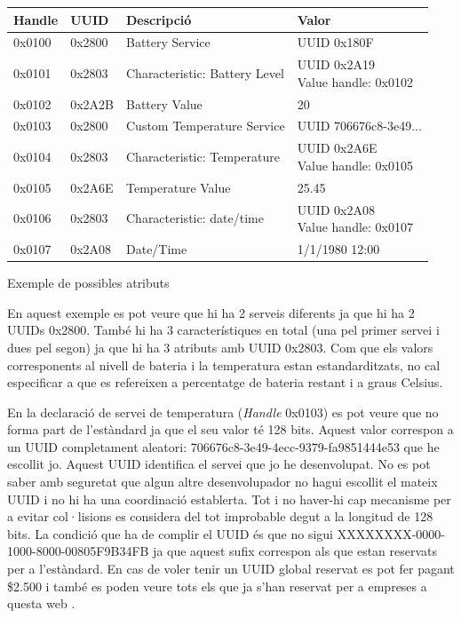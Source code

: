 \begin{center}
	\begin{tabular}{|l|l|l|l|}
		\hline
		Handle	&	UUID	&	Descripció						&	Valor		\\ 	\hline
		0x0100	&	0x2800	&	Battery Service					&	UUID 0x180F	\\		\hline
		0x0101	&	0x2803	&	Characteristic: Battery Level	&	\parbox[t]{4cm}{UUID 0x2A19	\\ Value handle: 0x0102}	\\	\hline
		0x0102	&	0x2A2B	&	Battery Value					&	20	\\	\hline
		0x0103	&	0x2800	&	Custom Temperature Service		&	UUID 	706676c8-3e49...	\\	\hline
		0x0104	&	0x2803	&	Characteristic: Temperature		&	\parbox[t]{4cm}{UUID 0x2A6E	\\ Value handle: 0x0105}	\\		\hline
		0x0105	&	0x2A6E	&	Temperature Value				&	25.45	\\	\hline
		0x0106	&	0x2803	&	Characteristic: date/time		&	\parbox[t]{4cm}{UUID 0x2A08	\\ Value handle: 0x0107}	\\		\hline
		0x0107	&	0x2A08	&	Date/Time						&	1/1/1980 12:00	\\
		\hline
	\end{tabular}

Exemple de possibles atributs
\end{center}

En aquest exemple es pot veure que hi ha 2 serveis diferents ja que hi ha 2 UUIDs 0x2800.
També hi ha 3 característiques en total (una pel primer servei i dues pel segon) ja que hi ha 3 atributs amb UUID 0x2803.
Com que els valors corresponents al nivell de bateria i la temperatura estan estandarditzats\cite{Battery_Level}\cite{Temperature_Characteristic}, no cal especificar a que es refereixen a percentatge de bateria restant i a graus Celsius.

En la declaració de servei de temperatura (\textit{Handle} 0x0103) es pot veure que no forma part de l'estàndard ja que el seu valor té 128 bits.
Aquest valor correspon a un UUID completament aleatori: 706676c8-3e49-4ecc-9379-fa9851444e53 que he escollit jo.
Aquest UUID identifica el servei que jo he desenvolupat.
No es pot saber amb seguretat que algun altre desenvolupador no hagui escollit el mateix UUID i no hi ha una coordinació establerta.
Tot i no haver-hi cap mecanisme per a evitar col·lisions es considera del tot improbable degut a la longitud  de 128 bits.
La condició que ha de complir el UUID és que no sigui XXXXXXXX-0000-1000-8000-00805F9B34FB ja que aquest sufix correspon als que estan reservats per a l'estàndard.
En cas de voler tenir un UUID global reservat es pot fer pagant \$2.500 i també es poden veure tots els que ja s'han reservat per a empreses a questa web \cite{reservedUUIDs}.

